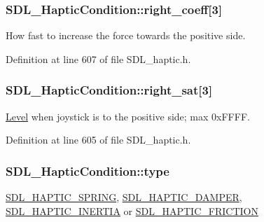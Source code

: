 \hypertarget{struct_s_d_l___haptic_condition_a3de7f164ef88841255535387d0f100b6}{
\subsubsection[{right\-\_\-coeff}]{ S\-D\-L\-\_\-\-Haptic\-Condition\-::right\-\_\-coeff\mbox{[}3\mbox{]}}}\label{struct_s_d_l___haptic_condition_a3de7f164ef88841255535387d0f100b6}
How fast to increase the force towards the positive side. 

Definition at line 607 of file S\-D\-L\-\_\-haptic.\-h.

\hypertarget{struct_s_d_l___haptic_condition_a90427a1e0d464b4b53abc1d419c97b2e}{
\subsubsection[{right\-\_\-sat}]{ S\-D\-L\-\_\-\-Haptic\-Condition\-::right\-\_\-sat\mbox{[}3\mbox{]}}}\label{struct_s_d_l___haptic_condition_a90427a1e0d464b4b53abc1d419c97b2e}
\hyperlink{class_level}{Level} when joystick is to the positive side; max 0x\-F\-F\-F\-F. 

Definition at line 605 of file S\-D\-L\-\_\-haptic.\-h.

\hypertarget{struct_s_d_l___haptic_condition_a7be55a9a86c05dd1a54a3006781cfa6f}{
\subsubsection[{type}]{ S\-D\-L\-\_\-\-Haptic\-Condition\-::type}}\label{struct_s_d_l___haptic_condition_a7be55a9a86c05dd1a54a3006781cfa6f}
\hyperlink{_s_d_l__haptic_8h_a3b52d4700380085e2b5d87bb20320fb1}{S\-D\-L\-\_\-\-H\-A\-P\-T\-I\-C\-\_\-\-S\-P\-R\-I\-N\-G}, \hyperlink{_s_d_l__haptic_8h_a69522f261973e3ea4273486141320a87}{S\-D\-L\-\_\-\-H\-A\-P\-T\-I\-C\-\_\-\-D\-A\-M\-P\-E\-R}, \hyperlink{_s_d_l__haptic_8h_a14b807471589120395aec28293cf6642}{S\-D\-L\-\_\-\-H\-A\-P\-T\-I\-C\-\_\-\-I\-N\-E\-R\-T\-I\-A} or \hyperlink{_s_d_l__haptic_8h_a98a5011311168d63921aaac21403a4d8}{S\-D\-L\-\_\-\-H\-A\-P\-T\-I\-C\-\_\-\-F\-R\-I\-C\-T\-I\-O\-N} 

